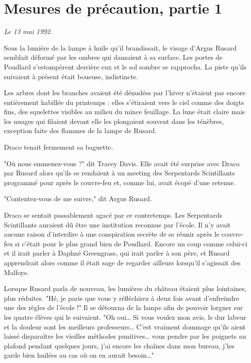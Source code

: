 
\chapter{Mesures de précaution, partie 1}

\emph{Le 13 mai 1992.} 

Sous la lumière de la lampe à huile qu'il brandissait, le visage d'Argus Rusard semblait déformé par les ombres qui dansaient à sa surface. Les portes de Poudlard s'estompèrent derrière eux et le sol sombre se rapprocha. La piste qu'ils suivaient à présent était boueuse, indistincte.

Les arbres dont les branches avaient été dénudées par l'hiver n'étaient pas encore entièrement habillée du printemps : elles s'étiraient vers le ciel comme des doigts fins, des squelettes visibles au milieu du mince feuillage. La lune était claire mais les nuages qui filaient devant elle les plongaient souvent dans les ténèbres, exception faite des flammes de la lampe de Rusard.

Draco tenait fermement sa baguette.

"Où nous emmenez-vous ?" dit Tracey Davis. Elle avait été surprise avec Draco par Rusard alors qu'ils se rendaient à un meeting des Serpentards Scintillants programmé pour après le couvre-feu et, comme lui, avait écopé d'une retenue.

"Contentez-vous de me suivre," dit Argus Rusard.

Draco se sentait passablement agacé par ce contretemps. Les Serpentards Scintillants auraient dû être une institution reconnue par l'école. Il n'y avait aucune raison d'interdire à une conspiration secrète de se réunir après le couvre-feu si c'était pour le plus grand bien de Poudlard. Encore un coup comme celui-ci et il irait parler à Daphné Greengrass, qui irait parler à son père, et Rusard apprendrait alors comme il était sage de regarder ailleurs lorsqu'il s'agissait des Malfoys.

Lorsque Rusard parla de nouveau, les lumières du château étaient plus lointaines, plus réduites. "Hé, je parie que vous y réfléchirez à deux fois avant d'enfreindre une des règles de l'école !" Il se détourna de la lampe afin de pouvoir lorgner sur les quatre élèves qui le suivaient. "Oh oui… Si vous voulez mon avis, le dur labeur et la douleur sont les meilleurs professeurs… C'est vraiment dommage qu'ils aient laissé disparaître les vieilles méthodes punitives… vous pendre par les poignets au plafond pendant quelques jours, j'ai encore les chaînes dans mon bureau, j'les garde bien huilées au cas où on en aurait besoin…"

